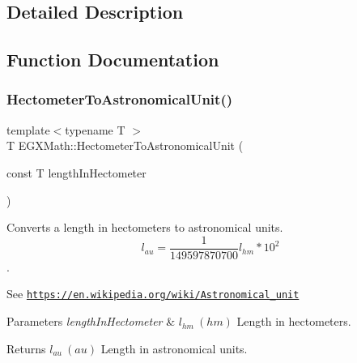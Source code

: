 \subsection{Detailed Description}


\subsection{Function Documentation}
\mbox{\label{group___e_g_x_math-_conversions-_length_conversions-_hectometer-_astronomical_gaf66d80d2e1aeac562f9a5b67626cc46f}} 
\subsubsection{\texorpdfstring{Hectometer\+To\+Astronomical\+Unit()}{HectometerToAstronomicalUnit()}}
{\footnotesize\ttfamily template$<$typename T $>$ \\
T E\+G\+X\+Math\+::\+Hectometer\+To\+Astronomical\+Unit (\begin{DoxyParamCaption}\item[{const T}]{length\+In\+Hectometer }\end{DoxyParamCaption})}



Converts a length in hectometers to astronomical units. \[ l_{au}= \frac{1}{149597870700} l_{hm} * 10^{2} \]. 

See \href{https://en.wikipedia.org/wiki/Astronomical_unit}{\tt https\+://en.\+wikipedia.\+org/wiki/\+Astronomical\+\_\+unit} 
\begin{DoxyParams}{Parameters}
{\em length\+In\+Hectometer} & $ l_{hm}\ (hm)$ Length in hectometers. \\
\hline
\end{DoxyParams}
\begin{DoxyReturn}{Returns}
$ l_{au}\ (au)$ Length in astronomical units. 
\end{DoxyReturn}
\mbox{\label{group___e_g_x_math-_conversions-_length_conversions-_hectometer-_astronomical_ga71004aaba27ec49989b80e41e2075376}} 
